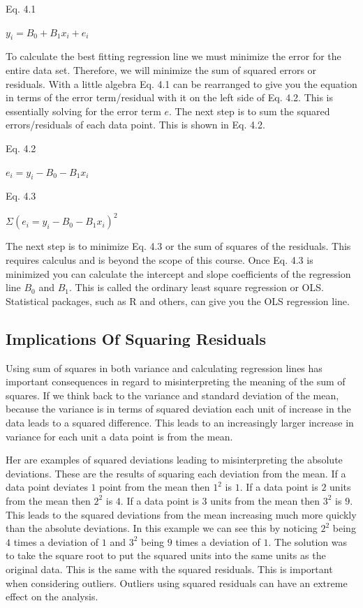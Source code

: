 \documentclass[]{book}
\theoremstyle{definition}
\theoremstyle{definition}
\theoremstyle{definition}
\theoremstyle{remark}
\begin{document}
Eq. 4.1

\(y_{i} = B_{0} + B_{1}x_{i} + e_{i}\)

To calculate the best fitting regression line we must minimize the error
for the entire data set. Therefore, we will minimize the sum of squared
errors or residuals. With a little algebra Eq. 4.1 can be rearranged to
give you the equation in terms of the error term/residual with it on the
left side of Eq. 4.2. This is essentially solving for the error term
\({e}\). The next step is to sum the squared errors/residuals of each
data point. This is shown in Eq. 4.2.

Eq. 4.2

\(e_{i} = y_{i} - B_{0} - B_{1}x_{i}\)

Eq. 4.3

\(\Sigma(e_{i} = y_{i} - B_{0} - B_{1}x_{i})^2\)

The next step is to minimize Eq. 4.3 or the sum of squares of the
residuals. This requires calculus and is beyond the scope of this
course. Once Eq. 4.3 is minimized you can calculate the intercept and
slope coefficients of the regression line \(B_{0}\) and \(B_{1}\). This
is called the ordinary least square regression or OLS. Statistical
packages, such as R and others, can give you the OLS regression line.

\hypertarget{implications-of-squaring-residuals}{%
\subsection{Implications Of Squaring
Residuals}\label{implications-of-squaring-residuals}}

Using sum of squares in both variance and calculating regression lines
has important consequences in regard to misinterpreting the meaning of
the sum of squares. If we think back to the variance and standard
deviation of the mean, because the variance is in terms of squared
deviation each unit of increase in the data leads to a squared
difference. This leads to an increasingly larger increase in variance
for each unit a data point is from the mean.

Her are examples of squared deviations leading to misinterpreting the
absolute deviations. These are the results of squaring each deviation
from the mean. If a data point deviates \(1\) point from the mean then
\(1^2\) is \(1\). If a data point is \(2\) units from the mean then
\(2^2\) is \(4\). If a data point is \(3\) units from the mean then
\(3^2\) is \(9\). This leads to the squared deviations from the mean
increasing much more quickly than the absolute deviations. In this
example we can see this by noticing \(2^2\) being \(4\) times a
deviation of \(1\) and \(3^2\) being \(9\) times a deviation of \(1\).
The solution was to take the square root to put the squared units into
the same units as the original data. This is the same with the squared
residuals. This is important when considering outliers. Outliers using
squared residuals can have an extreme effect on the analysis.
\end{document}
